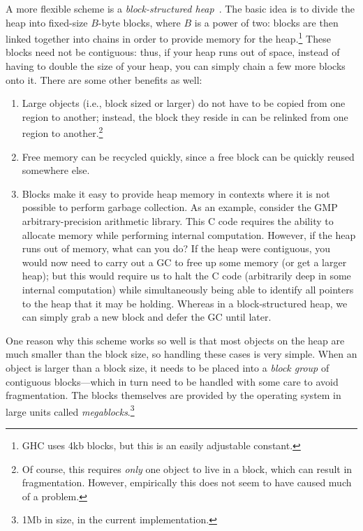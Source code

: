 A more flexible scheme is a \emph{block-structured heap}~\cite{maclisp,Dybvig94don'tstop,Marlow:2008:PGG:1375634.1375637}.
The basic idea is to divide the heap into fixed-size $B$-byte blocks,
where $B$ is a power of two: blocks are then linked together into chains in order to
provide memory for the heap.\footnote{GHC uses 4kb blocks, but this is an easily
adjustable constant.}  These blocks need not be contiguous: thus, if your
heap runs out of space, instead of having to double the size of your heap,
you can simply chain a few more blocks onto it.  There are some other benefits as well:

\begin{enumerate}
    \item Large objects (i.e., block sized or larger) do not have to be copied from one region to
        another; instead, the block they reside in can be relinked from
        one region to another.\footnote{Of course, this requires \emph{only}
        one object to live in a block, which can result in fragmentation.
        However, empirically this does not seem to have caused much of a problem.}
    \item Free memory can be recycled quickly, since a free block can be quickly
        reused somewhere else.
    \item Blocks make it easy to provide heap memory in contexts where it is
        not possible to perform garbage collection.  As an example, consider
        the GMP arbitrary-precision arithmetic library.  This C code requires
        the ability to allocate memory while performing internal computation.
        However, if the heap runs out of memory, what can you do?  If the heap
        were contiguous, you would now need to carry out a GC to free up some memory
        (or get a larger heap); but this would require us to halt the C code
        (arbitrarily deep in some internal computation) while simultaneously being
        able to identify all pointers to the heap that it may be holding.  Whereas
        in a block-structured heap, we can simply grab a new block and defer the GC
        until later.
\end{enumerate}

One reason why this scheme works so well is that most objects on the
heap are much smaller than the block size, so handling these cases is very
simple.  When an object is larger than a block size, it needs to be
placed into a \emph{block group} of contiguous blocks---which in turn
need to be handled with some care to avoid fragmentation.  The blocks
themselves are provided by the operating system in large units called
\emph{megablocks}.\footnote{1Mb in size, in the current implementation.}

